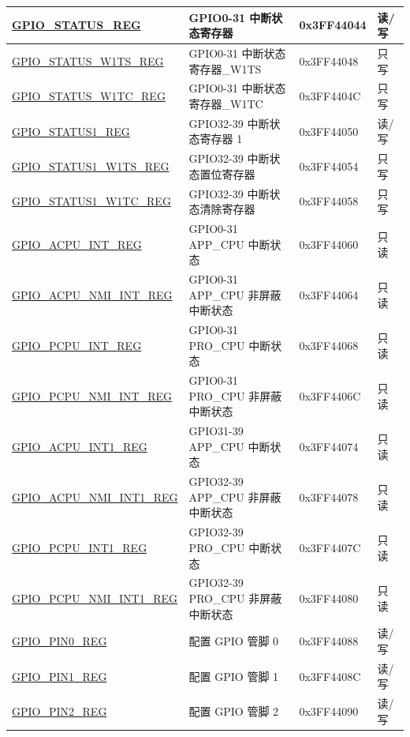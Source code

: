 \begin{longtable}{ | p{5.5cm} | p{7.5cm} | p{2cm} | p{1cm} | }
\hyperref[regdesc:GPIOSTATUSREG]{GPIO\_STATUS\_REG} & GPIO0-31 中断状态寄存器 & 0x3FF44044 & 读/写 \\ \hline
\hyperref[regdesc:GPIOSTATUSW1TSREG]{GPIO\_STATUS\_W1TS\_REG} & GPIO0-31 中断状态寄存器\_W1TS & 0x3FF44048 & 只写\\ \hline
\hyperref[regdesc:GPIOSTATUSW1TCREG]{GPIO\_STATUS\_W1TC\_REG} & GPIO0-31 中断状态寄存器\_W1TC & 0x3FF4404C & 只写 \\ \hline
\hyperref[regdesc:GPIOSTATUS1REG]{GPIO\_STATUS1\_REG} & GPIO32-39 中断状态寄存器 1 & 0x3FF44050 & 读/写 \\ \hline
\hyperref[regdesc:GPIOSTATUS1W1TSREG]{GPIO\_STATUS1\_W1TS\_REG} & GPIO32-39 中断状态置位寄存器 & 0x3FF44054 & 只写 \\ \hline
\hyperref[regdesc:GPIOSTATUS1W1TCREG]{GPIO\_STATUS1\_W1TC\_REG} & GPIO32-39 中断状态清除寄存器 & 0x3FF44058 & 只写 \\ \hline
\hyperref[regdesc:GPIOACPUINTREG]{GPIO\_ACPU\_INT\_REG} & GPIO0-31 APP\_CPU 中断状态 & 0x3FF44060 & 只读 \\ \hline
\hyperref[regdesc:GPIOACPUNMIINTREG]{GPIO\_ACPU\_NMI\_INT\_REG} & GPIO0-31 APP\_CPU 非屏蔽中断状态 & {0x3FF44064} & {只读} \\ \hline
\hyperref[regdesc:GPIOPCPUINT1REG]{GPIO\_PCPU\_INT\_REG} & GPIO0-31 PRO\_CPU 中断状态 & 0x3FF44068 & 只读 \\ \hline
\hyperref[regdesc:GPIOPCPUNMIINTREG]{GPIO\_PCPU\_NMI\_INT\_REG} & GPIO0-31 PRO\_CPU 非屏蔽中断状态 & {0x3FF4406C} & {只读} \\ \hline
\hyperref[regdesc:GPIOACPUINT1REG]{GPIO\_ACPU\_INT1\_REG} & GPIO31-39 APP\_CPU 中断状态 & 0x3FF44074 & 只读\\ \hline
{\hyperref[regdesc:GPIOACPUNMIINT1REG]{GPIO\_ACPU\_NMI\_INT1\_REG}} & GPIO32-39 APP\_CPU 非屏蔽中断状态 & {0x3FF44078} & {只读} \\ \hline
\hyperref[regdesc:GPIOPCPUINT1REG]{GPIO\_PCPU\_INT1\_REG} & GPIO32-39 PRO\_CPU 中断状态 & 0x3FF4407C & 只读 \\ \hline
\hyperref[regdesc:GPIOPCPUNMIINT1REG]{GPIO\_PCPU\_NMI\_INT1\_REG} & GPIO32-39 PRO\_CPU 非屏蔽中断状态 & {0x3FF44080} & {只读} \\ \hline
\hyperref[regdesc:GPIOPINnREG]{GPIO\_PIN0\_REG} & 配置 GPIO 管脚 0 & 0x3FF44088 & 读/写 \\ \hline
\hyperref[regdesc:GPIOPINnREG]{GPIO\_PIN1\_REG} & 配置 GPIO 管脚 1 & 0x3FF4408C & 读/写\\ \hline
\hyperref[regdesc:GPIOPINnREG]{GPIO\_PIN2\_REG} & 配置 GPIO 管脚 2 & 0x3FF44090 & 读/写 \\ \hline

\end{longtable}
